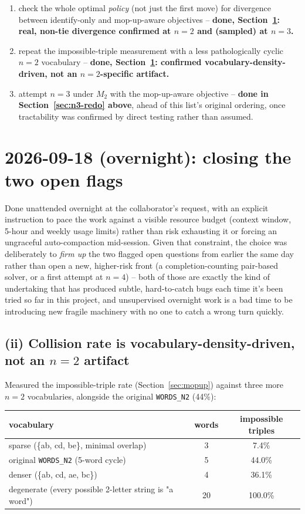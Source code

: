 \documentclass[11pt]{article}
\begin{document}
\begin{enumerate}
  \item[(i)] check the whole optimal \emph{policy} (not just the first
  move) for divergence between identify-only and mop-up-aware objectives
  -- \textbf{done, Section~\ref{sec:overnight}: real, non-tie divergence
  confirmed at $n=2$ and (sampled) at $n=3$.}
  \item[(ii)] repeat the impossible-triple measurement with a less
  pathologically cyclic $n=2$ vocabulary -- \textbf{done,
  Section~\ref{sec:overnight}: confirmed vocabulary-density-driven, not
  an $n=2$-specific artifact.}
  \item[(iii)] attempt $n=3$ under $M_2$ with the mop-up-aware objective
  -- \textbf{done in Section~\ref{sec:n3-redo} above}, ahead of this
  list's original ordering, once tractability was confirmed by direct
  testing rather than assumed.
\end{enumerate}

\section{2026-09-18 (overnight): closing the two open flags}
\label{sec:overnight}

Done unattended overnight at the collaborator's request, with an explicit
instruction to pace the work against a visible resource budget (context
window, 5-hour and weekly usage limits) rather than risk exhausting it or
forcing an ungraceful auto-compaction mid-session. Given that constraint,
the choice was deliberately to \emph{firm up} the two flagged open
questions from earlier the same day rather than open a new, higher-risk
front (a completion-counting pair-based solver, or a first attempt at
$n=4$) -- both of those are exactly the kind of undertaking that has
produced subtle, hard-to-catch bugs each time it's been tried so far in
this project, and unsupervised overnight work is a bad time to be
introducing new fragile machinery with no one to catch a wrong turn
quickly.

\subsection{(ii) Collision rate is vocabulary-density-driven, not an
$n=2$ artifact}

Measured the impossible-triple rate (Section~\ref{sec:mopup}) against
three more $n=2$ vocabularies, alongside the original \texttt{WORDS\_N2}
(44\%):

\begin{center}
\begin{tabular}{lcc}
\toprule
vocabulary & words & impossible triples \\
\midrule
sparse (\{ab, cd, be\}, minimal overlap) & 3 & 7.4\% \\
original \texttt{WORDS\_N2} (5-word cycle) & 5 & 44.0\% \\
denser (\{ab, cd, ae, bc\}) & 4 & 36.1\% \\
degenerate (every possible 2-letter string is "a word") & 20 & 100.0\% \\
\bottomrule
\end{tabular}
\end{center}
\end{document}

